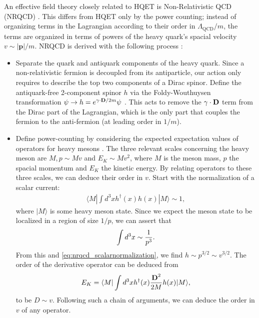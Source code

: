 An effective field theory closely related to HQET is Non-Relativistic QCD (NRQCD) \cite{CASWELL1986437,Bodwin:1994jh}. This differs from HQET only by the power counting; instead of organizing terms in the Lagrangian according to their order in $\Lambda_{\text{QCD}}/m$, the terms are organized in terms of powers of the heavy quark's spacial velocity $v \sim |{\textbf{p}}|/m$. NRQCD is derived with the following process \cite{Brambilla:2000cs}:
\begin{itemize}
\item
  Separate the quark and antiquark components of the heavy quark. Since a non-relativistic fermion is decoupled from its antiparticle, our action only requires to describe the top two components of a Dirac spinor.
  Define the antiquark-free 2-component spinor $h$ via the Foldy-Wouthuysen transformation $\psi \to h = e^{ {\bf{\gamma}}\cdot {\bf{D}}/2m} \psi$ \cite{PhysRev.78.29}. This acts to remove the ${\bf{\gamma}}\cdot {\bf{D}}$ term from the Dirac part of the Lagrangian, which is the only part that couples the fermion to the anti-fermion (at leading order in $1/m$).
\item
  Define power-counting by considering the expected expectation values of operators for heavy mesons \cite{Lepage:1992tx}. The three relevant scales concerning the heavy meson are $M$,$\,p\sim Mv$ and $E_K\sim Mv^2$, where $M$ is the meson mass, $p$ the spacial momentum and $E_K$ the kinetic energy. By relating operators to these three scales, we can deduce their order in $v$. Start with the normalization of a scalar current:
  \begin{align}
    \langle M | \int d^3x h^{\dagger}(x) h(x) | M \rangle \sim 1,
    \label{eq:nrqcd_scalarnormalization}
  \end{align}
  where $| M \rangle$ is some heavy meson state. Since we expect the meson state to be localized in a region of size $1/p$, we can assert that
  \begin{align}
    \int d^3x \sim {1\over p^3}.
  \end{align}
  From this and \eqref{eq:nrqcd_scalarnormalization}, we find $h \sim p^{3/2} \sim v^{3/2}$.
  The order of the derivative operator can be deduced from
  \begin{align}
    E_K = \langle M | \int d^3x h^{\dagger}(x) {{\textbf{D}}^2\over 2M} h(x) | M \rangle,
  \end{align}
  to be $D \sim v$. Following such a chain of arguments, we can deduce the order in $v$ of any operator.


\end{itemize}
